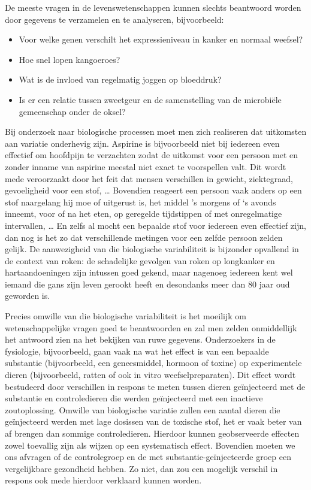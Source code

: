 \documentclass[12pt,dutch,coursenotes]{book}
\providecommand{\tightlist}{%
  \setlength{\itemsep}{0pt}\setlength{\parskip}{0pt}}
\theoremstyle{definition}
\theoremstyle{definition}
\theoremstyle{definition}
\theoremstyle{remark}
\begin{document}
De meeste vragen in de levenswetenschappen kunnen slechts beantwoord
worden door gegevens te verzamelen en te analyseren, bijvoorbeeld:

\begin{itemize}
\tightlist
\item
  Voor welke genen verschilt het expressieniveau in kanker en normaal
  weefsel?
\item
  Hoe snel lopen kangoeroes?
\item
  Wat is de invloed van regelmatig joggen op bloeddruk?
\item
  Is er een relatie tussen zweetgeur en de samenstelling van de
  microbiële gemeenschap onder de oksel?
\end{itemize}

Bij onderzoek naar biologische processen moet men zich realiseren dat
uitkomsten aan variatie onderhevig zijn. Aspirine is bijvoorbeeld niet
bij iedereen even effectief om hoofdpijn te verzachten zodat de uitkomst
voor een persoon met en zonder inname van aspirine meestal niet exact te
voorspellen valt. Dit wordt mede veroorzaakt door het feit dat mensen
verschillen in gewicht, ziektegraad, gevoeligheid voor een stof,
\ldots{} Bovendien reageert een persoon vaak anders op een stof
naargelang hij moe of uitgerust is, het middel 's morgens of `s avonds
inneemt, voor of na het eten, op geregelde tijdstippen of met
onregelmatige intervallen, \ldots{} En zelfs al mocht een bepaalde stof
voor iedereen even effectief zijn, dan nog is het zo dat verschillende
metingen voor een zelfde persoon zelden gelijk. De aanwezigheid van die
biologische variabiliteit is bijzonder opvallend in de context van
roken: de schadelijke gevolgen van roken op longkanker en
hartaandoeningen zijn intussen goed gekend, maar nagenoeg iedereen kent
wel iemand die gans zijn leven gerookt heeft en desondanks meer dan 80
jaar oud geworden is.

Precies omwille van die biologische variabiliteit is het moeilijk om
wetenschappelijke vragen goed te beantwoorden en zal men zelden
onmiddellijk het antwoord zien na het bekijken van ruwe gegevens.
Onderzoekers in de fysiologie, bijvoorbeeld, gaan vaak na wat het effect
is van een bepaalde substantie (bijvoorbeeld, een geneesmiddel, hormoon
of toxine) op experimentele dieren (bijvoorbeeld, ratten of ook in vitro
weefselpreparaten). Dit effect wordt bestudeerd door verschillen in
respons te meten tussen dieren geïnjecteerd met de substantie en
controledieren die werden geïnjecteerd met een inactieve zoutoplossing.
Omwille van biologische variatie zullen een aantal dieren die
geïnjecteerd werden met lage dosissen van de toxische stof, het er vaak
beter van af brengen dan sommige controledieren. Hierdoor kunnen
geobserveerde effecten zowel toevallig zijn als wijzen op een
systematisch effect. Bovendien moeten we ons afvragen of de
controlegroep en de met substantie-geïnjecteerde groep een vergelijkbare
gezondheid hebben. Zo niet, dan zou een mogelijk verschil in respons ook
mede hierdoor verklaard kunnen worden.
\end{document}
